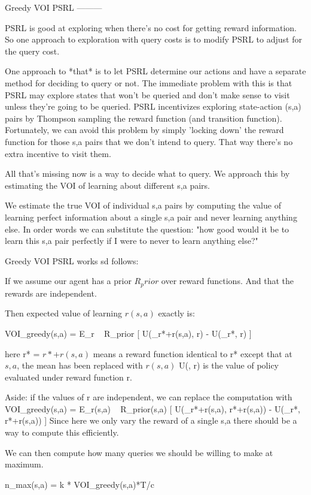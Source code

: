 Greedy VOI PSRL
---------

PSRL is good at exploring when there's no cost for getting reward information. So one approach to exploration with query costs is to modify PSRL to adjust for the query cost. 

One approach to *that* is to let PSRL determine our actions and have a separate method for deciding to query or not. The immediate problem with this is that PSRL may explore states that won't be queried and don't make sense to visit unless they're going to be queried. PSRL incentivizes exploring state-action (s,a) pairs by Thompson sampling the reward function (and transition function). Fortunately, we can avoid this problem by simply 'locking down' the reward function for those s,a pairs that we don't intend to query. That way there's no extra incentive to visit them.

All that's missing now is a way to decide what to query. We approach this by estimating the VOI of learning about different s,a pairs. 

We estimate the true VOI of individual s,a pairs by computing the value of learning perfect information about a single s,a pair and never learning anything else. 
In order words we can substitute the question: "how good would it be to learn this s,a pair perfectly if I were to never to learn anything else?"

Greedy VOI PSRL works sd follows: 

If we assume our agent has a prior $R_prior$ over reward functions. And that the rewards are independent. 

Then expected value of learning $r(s,a)$ exactly is:

VOI_greedy(s,a) = E_{r ~ R_prior}  [ 
  U(\pi_r*+r(s,a), r) - 
  U(\pi_r*,  r) 
  ]

here
r* = \mean[r]
$ r* + r(s,a) $ means a reward function identical to r* except that at $s,a$, the mean has been replaced with $r(s,a)$
U(\pi, r) is the value of policy \pi evaluated under reward function r.
 
Aside: if the values of r are independent, we can replace the computation with
  VOI_greedy(s,a) = E_{r(s,a) ~ R_prior(s,a)}  [ 
    U(\pi_r*+r(s,a), r*+r(s,a)) - 
    U(\pi_r*,  r*+r(s,a)) 
    ]
  Since here we only vary the reward of a single s,a there should be a way to compute this efficiently.

We can then compute how many queries we should be willing to make at maximum.

n_max(s,a) = k * VOI_greedy(s,a)*T/c 

